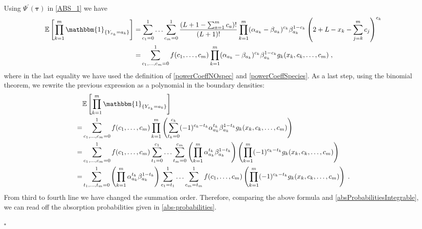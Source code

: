 \documentclass[10pt]{article}
\numberwithin{equation}{section}
\numberwithin{equation}{subsection}
\newcommand{\co}{\;,}
\newcommand{\dt}{\;.}
\begin{document}
Using $\Psi^{'}(\bm{\tau})$ in \eqref{ABS_1} we have 
\begin{align}
	\mathbb{E}\left[\prod_{k=1}^{m}\mathbbm{1}_{\{Y_{x_{k}}=a_{k}\}}\right]=&\sum_{c_{1}=0}^{1}\ldots\sum_{c_{m}=0}^{1}\frac{(L+1-\sum_{a=1}^{m}c_{a})!}{(L+1)!}\prod_{k=1}^{m}(\alpha_{a_{k}}-\beta_{a_{k}})^{c_{k}}\beta_{a_{k}}^{1-c_{k}}\left(2+L-x_{k}-\sum_{j=k}^{m}c_{j}\right)^{c_{k}}\nonumber\\
	=&\sum_{c_{1},\ldots,c_{m}=0}^{1}
	f(c_{1},\ldots,c_{m})\prod_{k=1}^{m}(\alpha_{a_{k}}-\beta_{a_{k}})^{c_{k}}\beta_{a_{k}}^{1-c_{k}}g_{k}(x_{k},c_{k},\ldots,c_{m})\co
\end{align}
where in the last equality we have used the definition of \eqref{powerCoeffNOspec} and \eqref{powerCoeffSpecies}.
As a last step, using the binomial theorem, we rewrite the previous expression as a polynomial in the boundary densities: 
\begin{align}
	&\mathbb{E}\left[\prod_{k=1}^{m}\mathbbm{1}_{\{Y_{x_{k}}=a_{k}\}}\right]\nonumber\\=&
	\sum_{c_{1},\ldots,c_{m}=0}^{1}
	f(c_{1},\ldots,c_{m})\prod_{k=1}^{m}\left(\sum_{t_{k}=0}^{c_{k}}(-1)^{c_{k}-t_{k}}\alpha_{a_{k}}^{t_{k}}\beta_{a_{k}}^{1-t_{k}}g_{k}(x_{k},c_{k},\ldots,c_{m})\right)\nonumber\\
	=&\sum_{c_{1},\ldots,c_{m}=0}^{1}
	f(c_{1},\ldots,c_{m})\sum_{t_{1}=0}^{c_{1}}\ldots\sum_{t_{m}=0}^{c_{m}}\left(\prod_{k=1}^{m}\alpha_{a_{k}}^{t_{k}}\beta_{a_{k}}^{1-t_{k}}\right)\left(\prod_{k=1}^{m}(-1)^{c_{k}-t_{k}}g_{k}(x_{k},c_{k},\ldots,c_{m})\right)\nonumber\\
	=&\sum_{t_{1},\ldots,t_{m}=0}^{1}\left(\prod_{k=1}^{m}\alpha_{a_{k}}^{t_{k}}\beta_{a_{k}}^{1-t_{k}}\right)\sum_{c_{1}=t_{1}}^{1}\ldots\sum_{c_{m}=t_{m}}^{1}f(c_{1},\ldots,c_{m})\left(\prod_{k=1}^{m}(-1)^{c_{k}-t_{k}}g_{k}(x_{k},c_{k},\ldots,c_{m})\right)\dt
\end{align}
From third to fourth line we have changed the summation order. Therefore, comparing the above formula and \eqref{absProbabilitiesIntegrable}, we can read off the absorption probabilities given in \eqref{abs-probabilities}.
\begin{flushright}
	$\square$
\end{flushright}
\end{document}

